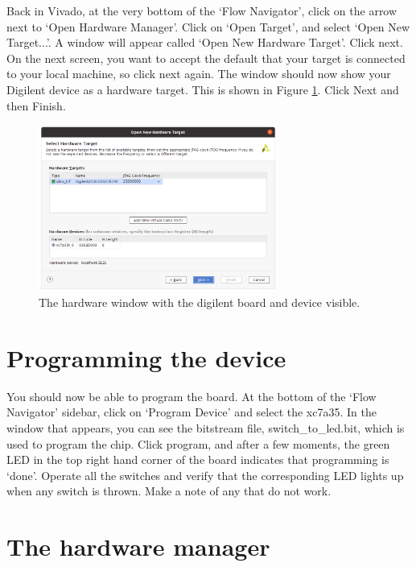 \documentclass[../physical_computing.tex]{subfiles}
\begin{document}
Back in Vivado, at the very bottom of the `Flow Navigator', click on the arrow next to `Open Hardware Manager'. Click on `Open Target', and select `Open New Target...'. A window will appear called `Open New Hardware Target'. Click next. On the next screen, you want to accept the default that your target is connected to your local machine, so click next again. The window should now show your Digilent device as a hardware target. This is shown in Figure \ref{fig:hardware_target}. Click Next and then Finish.

\begin{figure}[htbp]
    \centering
    \includegraphics[width=0.7\textwidth]{figures/hardware_target.png}
    \caption{The hardware window with the digilent board and device visible.}
    \label{fig:hardware_target}
\end{figure}

\section{Programming the device}
\label{sec:programming}

You should now be able to program the board. At the bottom of the `Flow Navigator' sidebar, click on `Program Device' and select the xc7a35. In the window that appears, you can see the bitstream file, switch\_to\_led.bit, which is used to program the chip. Click program, and after a few moments, the green LED in the top right hand corner of the board indicates that programming is `done'. Operate all the switches and verify that the corresponding LED lights up when any switch is thrown. Make a note of any that do not work.

\section{The hardware manager}
\label{sec:hardware_manager}
\end{document}
